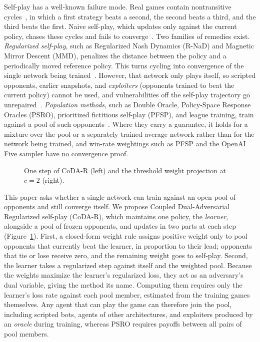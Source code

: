 \documentclass{article}
\theoremstyle{plain}
\theoremstyle{remark}
\newcommand{\codar}{CoDA-R}
\begin{document}
Self-play has a well-known failure mode. Real games contain nontransitive cycles~\citep{czarnecki2020spinning}, in which a first strategy beats a second, the second beats a third, and the third beats the first. Naive self-play, which updates only against the current policy, chases these cycles and fails to converge~\citep{balduzzi2018mechanics,balduzzi2019openended}. Two families of remedies exist. \emph{Regularized self-play}, such as Regularized Nash Dynamics (R-NaD) and Magnetic Mirror Descent (MMD), penalizes the distance between the policy and a periodically moved reference policy. This turns cycling into convergence of the single network being trained~\citep{perolat2021rnad,perolat2022stratego,sokota2023mmd}. However, that network only plays itself, so scripted opponents, earlier snapshots, and \emph{exploiters} (opponents trained to beat the current policy) cannot be used, and vulnerabilities off the self-play trajectory go unrepaired~\citep{openai2019dota,bansal2018emergent}. \emph{Population methods}, such as Double Oracle, Policy-Space Response Oracles (PSRO), prioritized fictitious self-play (PFSP), and league training, train against a pool of such opponents~\citep{mcmahan2003doubleoracle,lanctot2017psro,vinyals2019alphastar}. Where they carry a guarantee, it holds for a mixture over the pool or a separately trained average network rather than for the network being trained, and win-rate weightings such as PFSP and the OpenAI Five sampler have no convergence proof.

\begin{figure}[t]
\begin{center}

\end{center}
\vspace{-4pt}
\caption{One step of \codar{} (left) and the threshold weight projection at $c=2$ (right).}
\label{fig:overview}
\end{figure}

This paper asks whether a single network can train against an open pool of opponents and still converge itself. We propose Coupled Dual-Adversarial Regularized self-play (\codar{}), which maintains one policy, the \emph{learner}, alongside a pool of frozen opponents, and updates in two parts at each step (Figure~\ref{fig:overview}). First, a closed-form weight rule assigns positive weight only to pool opponents that currently beat the learner, in proportion to their lead; opponents that tie or lose receive zero, and the remaining weight goes to self-play. Second, the learner takes a regularized step against itself and the weighted pool. Because the weights maximize the learner's regularized loss, they act as an adversary's dual variable, giving the method its name. Computing them requires only the learner's loss rate against each pool member, estimated from the training games themselves. Any agent that can play the game can therefore join the pool, including scripted bots, agents of other architectures, and exploiters produced by an \emph{oracle} during training, whereas PSRO requires payoffs between all pairs of pool members.
\end{document}
